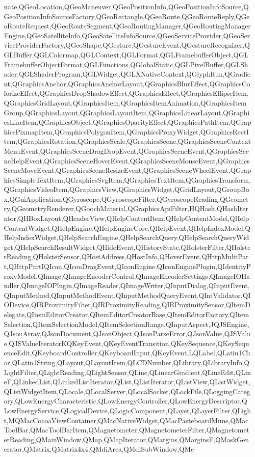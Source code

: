 {{nate,QGeoLocation,QGeoManeuver,QGeoPositionInfo,QGeoPositionInfoSource,QGeoPositionInfoSourceFactory,QGeoRectangle,QGeoRoute,QGeoRouteReply,QGeoRouteRequest,QGeoRouteSegment,QGeoRoutingManager,QGeoRoutingManagerEngine,QGeoSatelliteInfo,QGeoSatelliteInfoSource,QGeoServiceProvider,QGeoServiceProviderFactory,QGeoShape,QGesture,QGestureEvent,QGestureRecognizer,QGLBuffer,QGLColormap,QGLContext,QGLFormat,QGLFramebufferObject,QGLFramebufferObjectFormat,QGLFunctions,QGlobalStatic,QGLPixelBuffer,QGLShader,QGLShaderProgram,QGLWidget,QGLXNativeContext,QGlyphRun,QGradient,QGraphicsAnchor,QGraphicsAnchorLayout,QGraphicsBlurEffect,QGraphicsColorizeEffect,QGraphicsDropShadowEffect,QGraphicsEffect,QGraphicsEllipseItem,QGraphicsGridLayout,QGraphicsItem,QGraphicsItemAnimation,QGraphicsItemGroup,QGraphicsLayout,QGraphicsLayoutItem,QGraphicsLinearLayout,QGraphicsLineItem,QGraphicsObject,QGraphicsOpacityEffect,QGraphicsPathItem,QGraphicsPixmapItem,QGraphicsPolygonItem,QGraphicsProxyWidget,QGraphicsRectItem,QGraphicsRotation,QGraphicsScale,QGraphicsScene,QGraphicsSceneContextMenuEvent,QGraphicsSceneDragDropEvent,QGraphicsSceneEvent,QGraphicsSceneHelpEvent,QGraphicsSceneHoverEvent,QGraphicsSceneMouseEvent,QGraphicsSceneMoveEvent,QGraphicsSceneResizeEvent,QGraphicsSceneWheelEvent,QGraphicsSimpleTextItem,QGraphicsSvgItem,QGraphicsTextItem,QGraphicsTransform,QGraphicsVideoItem,QGraphicsView,QGraphicsWidget,QGridLayout,QGroupBox,QGuiApplication,QGyroscope,QGyroscopeFilter,QGyroscopeReading,QGeometry,QGeometryRenderer,QGoochMaterial,QGraphicsApiFilter,HQHash,QHashIterator,QHBoxLayout,QHeaderView,QHelpContentItem,QHelpContentModel,QHelpContentWidget,QHelpEngine,QHelpEngineCore,QHelpEvent,QHelpIndexModel,QHelpIndexWidget,QHelpSearchEngine,QHelpSearchQuery,QHelpSearchQueryWidget,QHelpSearchResultWidget,QHideEvent,QHistoryState,QHolsterFilter,QHolsterReading,QHolsterSensor,QHostAddress,QHostInfo,QHoverEvent,QHttpMultiPart,QHttpPartIQIcon,QIconDragEvent,QIconEngine,QIconEnginePlugin,QIdentityProxyModel,QImage,QImageEncoderControl,QImageEncoderSettings,QImageIOHandler,QImageIOPlugin,QImageReader,QImageWriter,QInputDialog,QInputEvent,QInputMethod,QInputMethodEvent,QInputMethodQueryEvent,QIntValidator,QIODevice,QIRProximityFilter,QIRProximityReading,QIRProximitySensor,QItemDelegate,QItemEditorCreator,QItemEditorCreatorBase,QItemEditorFactory,QItemSelection,QItemSelectionModel,QItemSelectionRange,QInputAspect,JQJSEngine,QJsonArray,QJsonDocument,QJsonObject,QJsonParseError,QJsonValue,QJSValue,QJSValueIteratorKQKeyEvent,QKeyEventTransition,QKeySequence,QKeySequenceEdit,QKeyboardController,QKeyboardInput,QKeyEvent,LQLabel,QLatin1Char,QLatin1String,QLayout,QLayoutItem,QLCDNumber,QLibrary,QLibraryInfo,QLightFilter,QLightReading,QLightSensor,QLine,QLinearGradient,QLineEdit,QLineF,QLinkedList,QLinkedListIterator,QList,QListIterator,QListView,QListWidget,QListWidgetItem,QLocale,QLocalServer,QLocalSocket,QLockFile,QLoggingCategory,QLowEnergyCharacteristic,QLowEnergyController,QLowEnergyDescriptor,QLowEnergyService,QLogicalDevice,QLogicComponent,QLayer,QLayerFilter,QLight,MQMacCocoaViewContainer,QMacNativeWidget,QMacPasteboardMime,QMacToolBar,QMacToolBarItem,QMagnetometer,QMagnetometerFilter,QMagnetometerReading,QMainWindow,QMap,QMapIterator,QMargins,QMarginsF,QMaskGenerator,QMatrix,QMatrix4x4,QMdiArea,QMdiSubWindow,QMe}}
